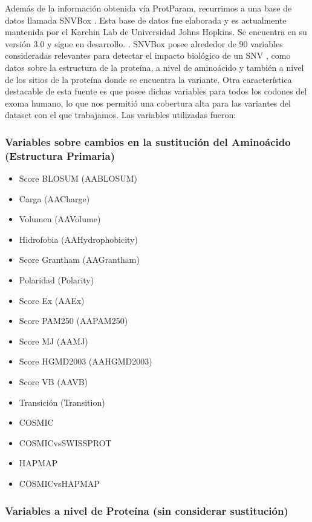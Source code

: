 Además de la información obtenida vía ProtParam, recurrimos a una base de datos llamada SNVBox \todo{[ref]}. Esta base de datos fue elaborada y es actualmente mantenida por el Karchin Lab de Universidad Johns Hopkins. Se encuentra en su versión 3.0 y sigue en desarrollo. . SNVBox posee alrededor de 90 variables consideradas relevantes para detectar el impacto biológico de un SNV \cite{Wong2011}, como datos sobre la estructura de la proteína, a nivel de aminoácido y también a nivel de los sitios de la proteína donde se encuentra la variante. Otra característica destacable de esta fuente es que posee dichas variables para todos los codones del exoma humano, lo que nos permitió una cobertura alta para las variantes del dataset con el que trabajamos. Las variables utilizadas fueron:

\subsubsection{Variables sobre cambios en la sustitución del Aminoácido (Estructura Primaria)}
\begin{itemize}
    \item Score BLOSUM (AABLOSUM)
    \item Carga (AACharge)
    \item Volumen (AAVolume)
    \item Hidrofobia (AAHydrophobicity)
    \item Score Grantham (AAGrantham)
    \item Polaridad (Polarity)
    \item Score Ex (AAEx)
    \item Score PAM250 (AAPAM250)
    \item Score MJ (AAMJ)
    \item Score HGMD2003 (AAHGMD2003)
    \item Score VB (AAVB)
    \item Transición (Transition)
    \item COSMIC
    \item COSMICvsSWISSPROT
    \item HAPMAP
    \item COSMICvsHAPMAP
\end{itemize}

\subsubsection{Variables a nivel de Proteína (sin considerar sustitución)}

